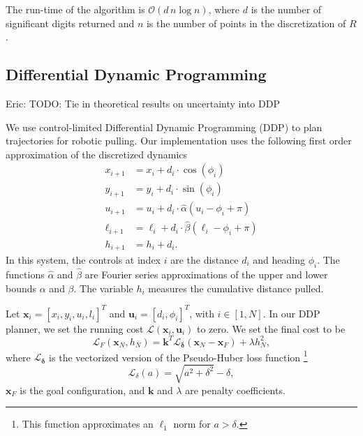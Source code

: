 \documentclass[conference]{IEEEtran}
\newcommand{\EH}[1]{{\color{blue} {Eric: {#1}}  }}
\begin{document}
The run-time of the algorithm is $\mathcal{O}(d\,n\log{} n)$, where
$d$ is the number of significant digits returned and $n$ is the number
of points in the discretization of $R$.

\subsection{Differential Dynamic Programming}\label{sec:diff-dynam-progr}
\EH{TODO: Tie in theoretical results on uncertainty into DDP} 

We use control-limited Differential Dynamic Programming (DDP)
\cite{tassa2014control} to plan trajectories for robotic pulling.  Our
implementation uses the following first order approximation of the
discretized dynamics
\begin{align}
  x_{i+1} &= x_i + d_i\cdot\cos(\phi_i) \\
  y_{i+1} &= y_i + d_i\cdot\sin(\phi_i)\\
  u_{i+1} &= u_i + d_i\cdot\hat{\alpha}(u_i - \phi_i + \pi) \\
  \ell_{i+1} &= \ell_i + d_i\cdot\hat{\beta}(\ell_i - \phi_i + \pi)\\
  h_{i+1} &= h_i + d_i.
\end{align}
In this system, the controls at index $i$ are the distance $d_i$ and
heading $\phi_i$. The functions $\hat{\alpha}$ and $\hat{\beta}$ are
Fourier series approximations of the upper and lower bounds $\alpha$
and $\beta$. The variable $h_i$ measures the cumulative distance
pulled.

Let $\mathbf{x}_i = [x_i,y_i,u_i,l_i]^T$ and
$\mathbf{u}_i = [d_i,\phi_i]^T$, with $i\in[1,N]$. In our DDP planner,
we set the running cost $\mathcal{L}(\mathbf{x}_i,\mathbf{u}_i)$ to
zero. We set the final cost to be
\begin{equation}
\mathcal{L}_F(\mathbf{x}_N,h_N) = \mathbf{k}^T\mathcal{L}_{\bm{\delta}}(\mathbf{x}_N-\mathbf{x}_F) + \lambda h_N^2,
\end{equation}
where $\mathcal{L}_{\bm{\delta}}$ is the vectorized version of the
Pseudo-Huber loss function \footnote{This function approximates an
  $\ell_1$ norm for $a > \delta$.}
\begin{equation}
\mathcal{L}_{\delta}(a) = \sqrt{a^2+\delta^2}-\delta,
\end{equation}
$\mathbf{x}_F$ is the goal configuration, and $\mathbf{k}$ and
$\lambda$ are penalty coefficients. 
\end{document}
